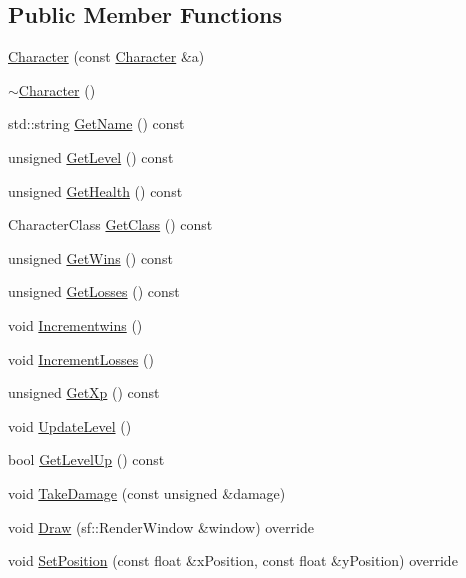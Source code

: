 \subsection*{Public Member Functions}
\begin{DoxyCompactItemize}
\item 
\hyperlink{class_character_a4c236e411ce0bf61200c4d88e36debc5}{Character} (const \hyperlink{class_character}{Character} \&a)
\item 
\hyperlink{class_character_a9e9be564d05ded80962b2045aa70b3fc}{$\sim$\+Character} ()
\item 
std\+::string \hyperlink{class_character_a8a39d33ea6e7520b61f3c083785d6035}{Get\+Name} () const 
\item 
unsigned \hyperlink{class_character_ad44a3a5644c62a4ae4feec398c77a137}{Get\+Level} () const 
\item 
unsigned \hyperlink{class_character_a6453138461bf9f62bdaeb07de9dacf8b}{Get\+Health} () const 
\item 
Character\+Class \hyperlink{class_character_abf7b793cda16b5924903d434de9e40a9}{Get\+Class} () const 
\item 
unsigned \hyperlink{class_character_a665088d6f0172b71cec106b68360a56a}{Get\+Wins} () const 
\item 
unsigned \hyperlink{class_character_a2a2b3a0964d0bffd300d7fcc34965376}{Get\+Losses} () const 
\item 
void \hyperlink{class_character_a6b5c00e13c98e143b10e7423fde49384}{Incrementwins} ()
\item 
void \hyperlink{class_character_ae810911be58f43ca4189b563383f1a49}{Increment\+Losses} ()
\item 
unsigned \hyperlink{class_character_a2bfad59dee714068f3f196fde4f47221}{Get\+Xp} () const 
\item 
void \hyperlink{class_character_a34ef80145d40f2d859b98398ec1be189}{Update\+Level} ()
\item 
bool \hyperlink{class_character_a73300e57fa813cf193c8f858ca081fd6}{Get\+Level\+Up} () const 
\item 
void \hyperlink{class_character_a08899a991714b1b880962064557e34bc}{Take\+Damage} (const unsigned \&damage)
\item 
void \hyperlink{class_character_a5816034e10d2ef4610719ad0a68e7314}{Draw} (sf\+::\+Render\+Window \&window) override
\item 
void \hyperlink{class_character_a6fd2cc7114d91771abc82f223bde585b}{Set\+Position} (const float \&x\+Position, const float \&y\+Position) override
\end{DoxyCompactItemize}
